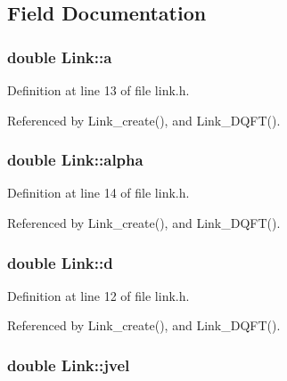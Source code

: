 \subsection{Field Documentation}
\hypertarget{structLink_a3ef89c4478d7e2de8a59de9c88052123}{
\subsubsection[{a}]{\setlength{\rightskip}{0pt plus 5cm}double Link\-::a}}\label{structLink_a3ef89c4478d7e2de8a59de9c88052123}


Definition at line 13 of file link.\-h.



Referenced by Link\-\_\-create(), and Link\-\_\-\-D\-Q\-F\-T().

\hypertarget{structLink_ab838e5bc121c212cb1a81fdf78de8757}{
\subsubsection[{alpha}]{\setlength{\rightskip}{0pt plus 5cm}double Link\-::alpha}}\label{structLink_ab838e5bc121c212cb1a81fdf78de8757}


Definition at line 14 of file link.\-h.



Referenced by Link\-\_\-create(), and Link\-\_\-\-D\-Q\-F\-T().

\hypertarget{structLink_a4e5e4ea2ef9be2aae1e9fdef406be185}{
\subsubsection[{d}]{\setlength{\rightskip}{0pt plus 5cm}double Link\-::d}}\label{structLink_a4e5e4ea2ef9be2aae1e9fdef406be185}


Definition at line 12 of file link.\-h.



Referenced by Link\-\_\-create(), and Link\-\_\-\-D\-Q\-F\-T().

\hypertarget{structLink_a9ba28f0b8b867ad4624abb9730ef30d2}{
\subsubsection[{jvel}]{\setlength{\rightskip}{0pt plus 5cm}double Link\-::jvel}}\label{structLink_a9ba28f0b8b867ad4624abb9730ef30d2}



